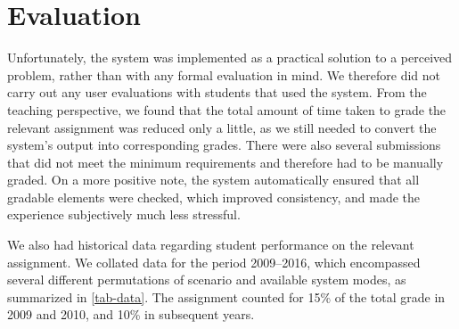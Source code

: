 \documentclass[sigconf, authordraft, capitalise]{acmart}
\begin{document}
\section{Evaluation}
\label{sec-evaluation}

Unfortunately, the system was implemented as a practical solution to a perceived problem, rather than with any formal evaluation in mind. We therefore did not carry out any user evaluations with students that used the system. From the teaching perspective, we found that the total amount of time taken to grade the relevant assignment was reduced only a little, as we still needed to convert the system's output into corresponding grades. There were also several submissions that did not meet the minimum requirements and therefore had to be manually graded. On a more positive note, the system automatically ensured that all gradable elements were checked, which improved consistency, and made the experience subjectively much less stressful.

We also had historical data regarding student performance on the relevant assignment. We collated data for the period 2009--2016, which encompassed several different permutations of scenario and available system modes, as summarized in \cref{tab-data}. The assignment counted for 15\% of the total grade in 2009 and 2010, and 10\% in subsequent years.
\end{document}
